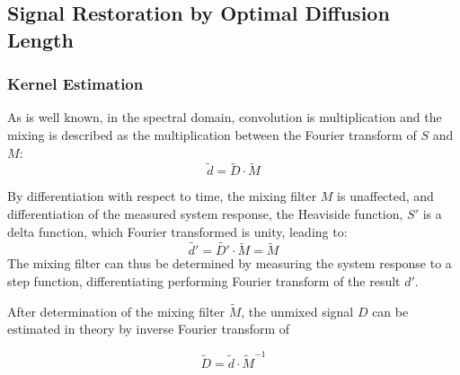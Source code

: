 \documentclass[../../CompleteThesis2/Complete_2ndDraft]{subfiles}
\begin{document}
\subsection[Signal Restoration][Signal Restoration]{Signal Restoration by Optimal Diffusion Length}
\label{Subsec:SignalAnalysis_BackDiffusion_SignalRestoration}
\subsubsection{Kernel Estimation}
\label{Subsubsec:SignalAnalysis_BackDiffusion_SignalRestoration_KernelEstimation}
As is well known, in the spectral domain, convolution is multiplication and the mixing is described as the multiplication between the Fourier transform of $S$ and $M$:
\begin{equation}
	\tilde{d} = \tilde{D} \cdot \tilde{M}
\end{equation}


By differentiation with respect to time, the mixing filter $M$ is unaffected, and differentiation of the measured system response, the Heaviside function, $S'$ is a delta function, which Fourier transformed is unity, leading to:
\begin{equation}
	\tilde{d'} = \tilde{D'} \cdot \tilde{M} = \tilde{M}
\end{equation}
The mixing filter can thus be determined by measuring the system response to a step function, differentiating performing Fourier transform of the result $d'$.

After determination of the mixing filter $\tilde{M}$, the unmixed signal $D$ can be estimated in theory by inverse Fourier transform of


\begin{equation}
	\tilde{D} = \tilde{d}\cdot\tilde{M}^{-1}
	\label{eq:Restoration}
\end{equation}
\end{document}
